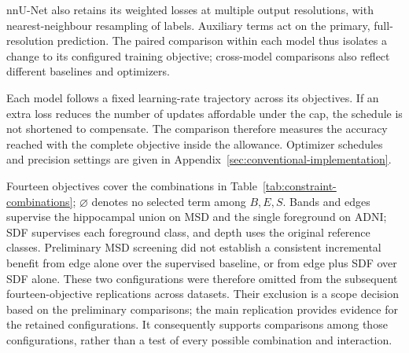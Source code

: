 \documentclass[12pt,a4paper]{article}
\begin{document}
nnU-Net also retains its weighted losses at multiple output resolutions,
with nearest-neighbour resampling of labels. Auxiliary terms act on
the primary, full-resolution prediction. The paired comparison within
each model thus isolates a change to its configured training objective;
cross-model comparisons also reflect different baselines and optimizers.

Each model follows a fixed learning-rate trajectory across its
objectives. If an extra loss reduces the number of updates affordable
under the cap, the schedule is not shortened to compensate. The
comparison therefore measures the accuracy reached with the complete
objective inside the allowance. Optimizer schedules and precision
settings are given in Appendix~\ref{sec:conventional-implementation}.

Fourteen objectives cover the combinations in
Table~\ref{tab:constraint-combinations}; $\varnothing$ denotes no
selected term among $B,E,S$. Bands and edges supervise
the hippocampal union on MSD and the single foreground on ADNI; SDF
supervises each foreground class, and depth
uses the original reference classes. Preliminary MSD screening did not
establish a consistent incremental benefit from edge alone over the
supervised baseline, or from edge plus SDF over SDF alone. These two
configurations were therefore omitted from the subsequent
fourteen-objective replications across datasets. Their exclusion is a
scope decision based on the preliminary comparisons; the main replication
provides evidence for the retained configurations. It consequently
supports comparisons among those configurations, rather than a test of every possible combination and interaction.
\end{document}
